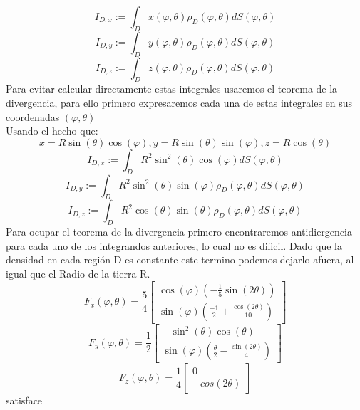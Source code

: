 \documentclass[20pt]{report}
\begin{document}
\begin{itemize}
\begin{equation}\label{I1}
I_{D,x} := \int_D x(\varphi, \theta) \rho_D(\varphi,\theta) dS(\varphi, \theta) 
\end{equation}
\begin{equation}\label{I1}
I_{D,y} := \int_D y(\varphi, \theta) \rho_D(\varphi,\theta) dS(\varphi, \theta) 
\end{equation}
\begin{equation}\label{I1}
I_{D,z} := \int_D z(\varphi, \theta) \rho_D(\varphi,\theta) dS(\varphi, \theta) 
\end{equation}
Para evitar calcular directamente estas integrales usaremos el teorema de la divergencia, para ello primero expresaremos cada una de estas integrales en  sus coordenadas $(\varphi, \theta)$
\\
Usando el hecho que:
\[x=R\sin(\theta)\cos(\varphi),y=R\sin(\theta)\sin(\varphi),z=R\cos(\theta) \]
\begin{equation}\label{I1}
I_{D,x} := \int_D  R^2\sin^2(\theta)\cos(\varphi) dS(\varphi, \theta) 
\end{equation}
\begin{equation}\label{I1}
I_{D,y} := \int_D R^2\sin^2(\theta)\sin(\varphi) \rho_D(\varphi,\theta) dS(\varphi, \theta) 
\end{equation}
\begin{equation}\label{I1}
I_{D,z} := \int_D R^2\cos(\theta)\sin(\theta) \rho_D(\varphi,\theta) dS(\varphi, \theta) 
\end{equation}
Para ocupar el teorema de la divergencia primero encontraremos antidiergencia para cada uno de los integrandos anteriores, lo cual no es dificil. Dado que la densidad en cada regi\'on D es constante este termino podemos dejarlo afuera, al igual que el Radio de la tierra R.
\begin{equation}\label{F}
F_x(\varphi, \theta) = \frac{5}{4}\begin{bmatrix}
\cos(\varphi)(-\frac{1}{5}\sin(2\theta))\\[2ex]
\sin(\varphi)(\frac{-1}{2}+\frac{\cos(2\theta)}{10})
\end{bmatrix}
\end{equation}
%
\begin{equation}\label{F}
F_y(\varphi, \theta) = \frac{1}{2}\begin{bmatrix}
-\sin^2(\theta)\cos(\theta) \\[2ex]
\sin(\varphi)(\frac{\theta}{2}-\frac{\sin(2 \theta)}{4})
\end{bmatrix}
\end{equation}
\begin{equation}\label{F}
F_z(\varphi, \theta) = \frac{1}{4}\begin{bmatrix}
0\\[2ex]
-cos(2\theta)
\end{bmatrix}
\end{equation}
satisface
%
\pagebreak


\end{itemize}
\end{document}
